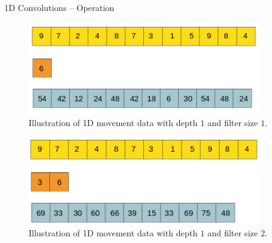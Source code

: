 \begin{vbframe}{1D Convolutions -- Operation}
    \begin{figure}
        \centering
        \includegraphics[width=10cm]{figure/conv1d-1.png}
        \caption{Illustration of 1D movement data with depth $1$ and filter size $1$. }
    \end{figure}
\framebreak
    \begin{figure}
        \centering
        \includegraphics[width=10cm]{figure/conv1d-2.png}
        \caption{Illustration of 1D movement data with depth $1$ and filter size $2$. }
    \end{figure}
\end{vbframe}


